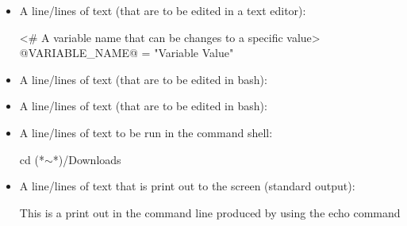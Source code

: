 \begin{itemize}


\item \begin{minipage}[t]{\textwidth} 
A line/lines of text (that are to be edited in a text editor):
\begin{latexbox}
\begin{textbox}
<# A variable name that can be changes to a specific value>
@VARIABLE_NAME@ = "Variable Value"
\end{textbox}
\end{latexbox}
\end{minipage}


\item \begin{minipage}[t]{\textwidth} 
A line/lines of text (that are to be edited in bash):
\begin{latexbox}
\end{latexbox}
\end{minipage}


\item \begin{minipage}[t]{\textwidth}
A line/lines of text (that are to be edited in bash):
\begin{latexbox}
\end{latexbox}
\end{minipage}


\item \begin{minipage}[t]{\textwidth} 
A line/lines of text to be run in the command shell:
\begin{latexbox}
\begin{cmdbox}
cd (*$\sim$*)/Downloads
\end{cmdbox}
\end{latexbox}
\end{minipage}


\item \begin{minipage}[t]{\textwidth} 
A line/lines of text that is print out to the screen (standard output):
\begin{latexbox}
\begin{cmdboxprint}
 This is a print out in the command line
 produced by using the echo command
\end{cmdboxprint}
\end{latexbox}
\end{minipage}



\end{itemize}
